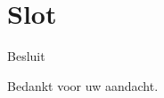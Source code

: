\documentclass[t]{beamer}
\begin{document}
\section{Slot}
\begin{frame}{Besluit}
\vspace{0.8in}
\begin{center}
Bedankt voor uw aandacht.
\end{center}
\end{frame}
\end{document}
